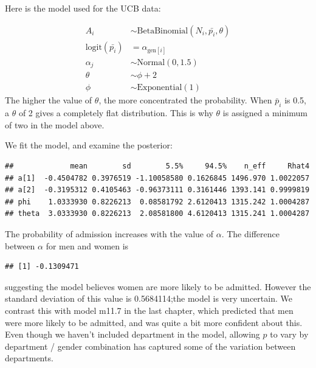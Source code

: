 \documentclass[
]{book}
\newenvironment{Shaded}{\begin{snugshade}}{\end{snugshade}}
\newcommand{\FunctionTok}[1]{\textcolor[rgb]{0.00,0.00,0.00}{#1}}
\newcommand{\NormalTok}[1]{#1}
\newcommand{\SpecialCharTok}[1]{\textcolor[rgb]{0.00,0.00,0.00}{#1}}
\begin{document}
Here is the model used for the UCB data:

\[
\begin{aligned}
A_i &\sim \text{BetaBinomial}(N_i,\bar{p_i},\theta) \\
\text{logit}(\bar{p_i}) &= \alpha_{\text{gen}[i]} \\
\alpha_j &\sim \text{Normal}(0,1.5) \\
\theta & \sim \phi + 2 \\
\phi & \sim \text{Exponential}(1)
\end{aligned}
\]
The higher the value of \(\theta\), the more concentrated the probability. When \(\bar{p}_i\) is 0.5, a \(\theta\) of 2 gives a completely flat distribution. This is why \(\theta\) is assigned a minimum of two in the model above.

We fit the model, and examine the posterior:

\begin{verbatim}
##             mean        sd        5.5%     94.5%    n_eff     Rhat4
## a[1]  -0.4504782 0.3976519 -1.10058580 0.1626845 1496.970 1.0022057
## a[2]  -0.3195312 0.4105463 -0.96373111 0.3161446 1393.141 0.9999819
## phi    1.0333930 0.8226213  0.08581792 2.6120413 1315.242 1.0004287
## theta  3.0333930 0.8226213  2.08581800 4.6120413 1315.241 1.0004287
\end{verbatim}

The probability of admission increases with the value of \(\alpha\). The difference between \(\alpha\) for men and women is

\begin{Shaded}
\end{Shaded}

\begin{verbatim}
## [1] -0.1309471
\end{verbatim}

suggesting the model believes women are more likely to be admitted. However the standard deviation of this value is 0.5684114;the model is very uncertain. We contrast this with model m11.7 in the last chapter, which predicted that men were more likely to be admitted, and was quite a bit more confident about this. Even though we haven't included department in the model, allowing \(p\) to vary by department / gender combination has captured some of the variation between departments.
\end{document}
